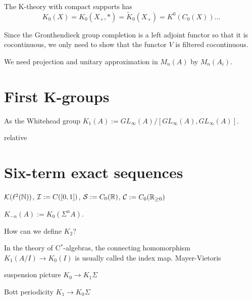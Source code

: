 \documentclass{../../large}
\begin{document}
The K-theory with compact supports has
\[K_0(X)=K_0(X_+,*)=\tilde K_0(X_+)=K^0(C_0(X))...\]



\begin{prb}

Since the Gronthendieck group completion is a left adjoint functor so that it is cocontinuous, we only need to show that the functor $V$ is filtered cocontinuous.

We need projection and unitary approximation in $M_n(A)$ by $M_n(A_i)$.

\end{prb}



\begin{prb}

\end{prb}













\section{First K-groups}

As the Whitehead group $K_1(A):=GL_\infty(A)/[GL_\infty(A),GL_\infty(A)]$.

relative



\section{Six-term exact sequences}


$\mathcal{K}(\ell^2(\mathbb{N}))$, $\mathcal{I}:=C([0,1])$, $\mathcal{S}:=C_0(\mathbb{R})$, $\mathcal{C}:=C_0(\mathbb{R}_{\ge0})$

$K_{-n}(A):=K_0(\Sigma^nA)$.

How can we define $K_2$?


\begin{prb}
In the theory of C$^*$-algebras, the connecting homomorphism $K_1(A/I)\to K_0(I)$ is usually called the index map.
Mayer-Vietoris
\end{prb}

\begin{prb}

suspension picture $K_0\to K_1\Sigma$

Bott periodicity $K_1\to K_0\Sigma$

\end{prb}
\end{document}
